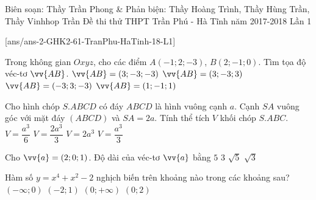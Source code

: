\begin{name}
{Biên soạn: Thầy Trần Phong \& Phản biện: Thầy Hoàng Trình, Thầy Hùng Trần, Thầy Vinhhop Trần}
{Đề thi thử THPT Trần Phú - Hà Tĩnh năm 2017-2018 Lần 1}
\end{name}

\setcounter{ex}{0}

[ans/ans-2-GHK2-61-TranPhu-HaTinh-18-L1]

\begin{ex}%
Trong không gian $Oxyz$, cho các điểm $A(-1;2;-3)$, $B(2;-1;0)$. Tìm tọa độ véc-tơ $\vv{AB}$.
\choice
{$\vv{AB}=(3;-3;-3)$}
{\True $\vv{AB}=(3;-3;3)$}
{$\vv{AB}=(-3;3;-3)$}
{$\vv{AB}=(1;-1;1)$}
\end{ex}

\begin{ex}%
Cho hình chóp $S.ABCD$ có đáy $ABCD$ là hình vuông cạnh $a$. Cạnh $SA$ vuông góc với mặt đáy $(ABCD)$ và $SA=2a$. Tính thể tích $V$ khối chóp $S.ABC$.
\choice
{$V=\dfrac{a^3}{6}$}
{$V=\dfrac{2a^3}{3}$}
{$V=2a^3$}
{\True $V=\dfrac{a^3}{3}$}
\end{ex}

\begin{ex}%
Cho $\vv{a}=(2;0;1)$. Độ dài của véc-tơ $\vv{a}$ bằng
\choice
{$5$}
{$3$}
{\True $\sqrt5$}
{$\sqrt3$}
\end{ex}

\begin{ex}%
Hàm số $y=x^4+x^2-2$ nghịch biến trên khoảng nào trong các khoảng sau?
\choice
{\True $(-\infty;0)$}
{$(-2;1)$}
{$(0;+\infty)$}
{$(0;2)$}
\end{ex}

